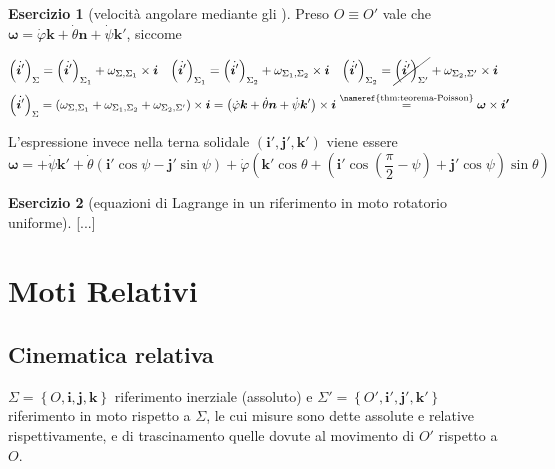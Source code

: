 \documentclass[a4paper,10pt]{article}
\providecommand{\exercisename}{Esercizio}
\theoremstyle{definition}
\newtheorem*{xca*}{\protect\exercisename}
\theoremstyle{indentdefinition}
\theoremstyle{indenttheorem}
\theoremstyle{myremark}
\theoremstyle{indentgeneral}
\begin{document}
\begin{xca*}[velocità angolare mediante gli ]
Preso $O\equiv O'$ vale che $\boldsymbol{\omega}=\dot{\varphi}\boldsymbol{k}+\dot{\theta}\boldsymbol{n}+\dot{\psi}\boldsymbol{k}'$,
siccome

\begin{align*}
\left(\dot{\boldsymbol{i}'}\right)_{\Sigma} & =\left(\dot{\boldsymbol{i}'}\right)_{\Sigma_{1}}+\omega_{\Sigma,\Sigma_{1}}\times\boldsymbol{i} & \left(\dot{\boldsymbol{i}'}\right)_{\Sigma_{1}} & =\left(\dot{\boldsymbol{i}'}\right)_{\Sigma_{2}}+\omega_{\Sigma_{1},\Sigma_{2}}\times\boldsymbol{i} & \left(\dot{\boldsymbol{i}'}\right)_{\Sigma_{2}} & =\cancel{\left(\dot{\boldsymbol{i}'}\right)_{\Sigma'}}+\omega_{\Sigma_{2},\Sigma'}\times\boldsymbol{i}
\end{align*}
\[
\left(\dot{\boldsymbol{i}'}\right)_{\Sigma}=\left(\omega_{\Sigma,\Sigma_{1}}+\omega_{\Sigma_{1},\Sigma_{2}}+\omega_{\Sigma_{2},\Sigma'}\right)\times\boldsymbol{i}=\left(\dot{\varphi}\boldsymbol{k}+\dot{\theta}\boldsymbol{n}+\dot{\psi}\boldsymbol{k}'\right)\times\boldsymbol{i}\overset{\text{\nameref{thm:teorema-Poisson}}}{=}\boldsymbol{\omega}\times\boldsymbol{i'}
\]

L'espressione invece nella terna solidale $\left(\boldsymbol{i}',\boldsymbol{j}',\boldsymbol{k}'\right)$
viene essere
\[
\boldsymbol{\omega}=+\dot{\psi}\boldsymbol{k}'+\dot{\theta}\left(\boldsymbol{i}'\cos\psi-\boldsymbol{j}'\sin\psi\right)+\dot{\varphi}\left(\boldsymbol{k}'\cos\theta+\left(\boldsymbol{i}'\cos\left(\frac{\pi}{2}-\psi\right)+\boldsymbol{j}'\cos\psi\right)\sin\theta\right)
\]
\end{xca*}
%
\begin{xca*}[equazioni di Lagrange in un riferimento in moto rotatorio uniforme]
{[}...{]}
\end{xca*}



\pagebreak{}

\section{Moti Relativi}
\subsection{Cinematica relativa}

$\Sigma=\left\{ O,\boldsymbol{i},\boldsymbol{j},\boldsymbol{k}\right\} $
riferimento inerziale (assoluto) e $\Sigma'=\left\{ O',\boldsymbol{i}',\boldsymbol{j}',\boldsymbol{k}'\right\} $
riferimento in moto rispetto a $\Sigma$, le cui misure sono dette
assolute e relative rispettivamente, e di trascinamento quelle dovute
al movimento di $O'$ rispetto a $O$.
\end{document}
